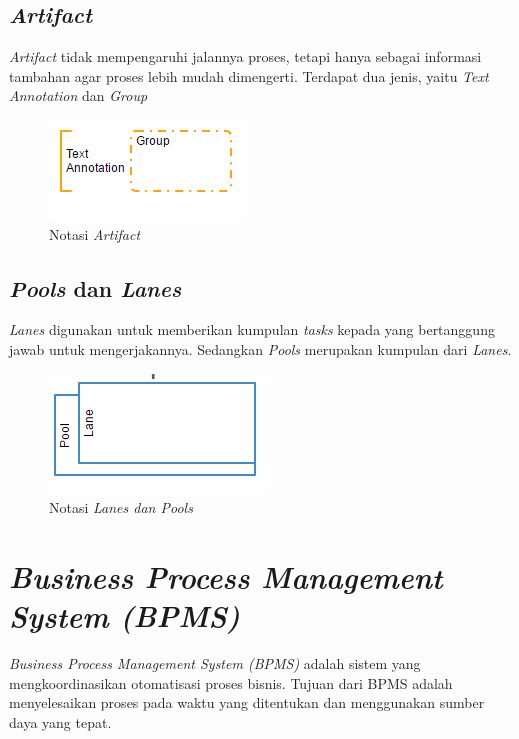 \subsection{\textit{Artifact}}
\label{sec:artifacts}
\textit{Artifact} tidak mempengaruhi jalannya proses, tetapi hanya sebagai informasi tambahan agar proses lebih mudah dimengerti. Terdapat dua jenis, yaitu \textit{Text Annotation} dan \textit{Group}
\begin{figure}[H]
	\centering
	\includegraphics[scale=1]{Gambar/Bab-2/bpmn/artifact}
	\caption{Notasi \textit{Artifact} }
	\label{artifact}
\end{figure}


\subsection{\textit{Pools} dan \textit{Lanes}}
\label{sec:poolslanes}
\textit{Lanes} digunakan untuk memberikan kumpulan \textit{tasks} kepada yang bertanggung jawab untuk mengerjakannya. Sedangkan \textit{Pools} merupakan kumpulan dari \textit{Lanes}.
\begin{figure}[H]
	\centering
	\includegraphics[scale=1]{Gambar/Bab-2/bpmn/swimlane}
	\caption{Notasi \textit{Lanes dan Pools}} 
	\label{lanespools}
\end{figure}


 

\section{\textit{Business Process Management System (BPMS)}}
\textit{Business Process Management System (BPMS)} adalah sistem yang mengkoordinasikan otomatisasi proses bisnis. Tujuan dari BPMS adalah menyelesaikan proses pada waktu yang ditentukan dan menggunakan sumber daya yang tepat. 

